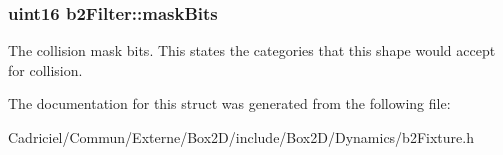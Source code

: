 \subsubsection[{\texorpdfstring{mask\+Bits}{maskBits}}]{\setlength{\rightskip}{0pt plus 5cm}uint16 b2\+Filter\+::mask\+Bits}\hypertarget{structb2_filter_a533cccf85e3ba3d9e3700d73b819f6e2}{}\label{structb2_filter_a533cccf85e3ba3d9e3700d73b819f6e2}
The collision mask bits. This states the categories that this shape would accept for collision. 

The documentation for this struct was generated from the following file\+:\begin{DoxyCompactItemize}
\item 
Cadriciel/\+Commun/\+Externe/\+Box2\+D/include/\+Box2\+D/\+Dynamics/b2\+Fixture.\+h\end{DoxyCompactItemize}
